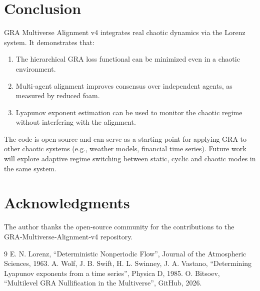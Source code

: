 \documentclass[12pt,a4paper]{article}
\begin{document}
\section{Conclusion}
GRA Multiverse Alignment v4 integrates real chaotic dynamics via the Lorenz system. It demonstrates that:
\begin{enumerate}
    \item The hierarchical GRA loss functional can be minimized even in a chaotic environment.
    \item Multi‑agent alignment improves consensus over independent agents, as measured by reduced foam.
    \item Lyapunov exponent estimation can be used to monitor the chaotic regime without interfering with the alignment.
\end{enumerate}
The code is open‑source and can serve as a starting point for applying GRA to other chaotic systems (e.g., weather models, financial time series). Future work will explore adaptive regime switching between static, cyclic and chaotic modes in the same system.

\section*{Acknowledgments}
The author thanks the open‑source community for the contributions to the GRA‑Multiverse‑Alignment‑v4 repository.

\begin{thebibliography}{9}
 E. N. Lorenz, “Deterministic Nonperiodic Flow”, Journal of the Atmospheric Sciences, 1963.
 A. Wolf, J. B. Swift, H. L. Swinney, J. A. Vastano, “Determining Lyapunov exponents from a time series”, Physica D, 1985.
 O. Bitsoev, “Multilevel GRA Nullification in the Multiverse”, GitHub, 2026.
\end{thebibliography}
\end{document}
